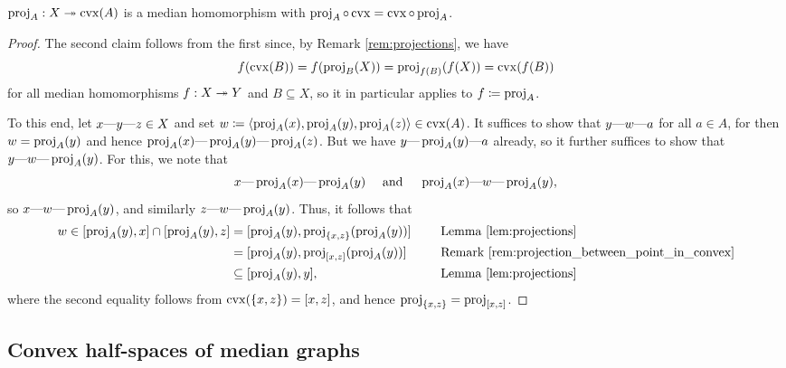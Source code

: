 \documentclass[reqno]{amsart}
\begin{document}
    \begin{lemma}\label{lem:projection_homomorphism}
        $\proj_A:X\onto\cvx(A)$ is a median homomorphism with $\proj_A\circ\cvx=\cvx\circ\proj_A$.
    \end{lemma}
    \begin{proof}
        The second claim follows from the first since, by Remark \ref{rem:projections}, we have
        \begin{equation*}
            f(\cvx(B))=f(\proj_B(X))=\proj_{f(B)}(f(X))=\cvx(f(B))
        \end{equation*}
        for all median homomorphisms $f:X\onto Y$ and $B\subseteq X$, so it in particular applies to $f\coloneqq\proj_A$.

        To this end, let $x\-y\-z\in X$ and set $w\coloneqq\l\langle\proj_A(x),\proj_A(y),\proj_A(z)\r\rangle\in\cvx(A)$. It suffices to show that $y\-w\-a$ for all $a\in A$, for then $w=\proj_A(y)$ and hence $\proj_A(x)\-\proj_A(y)\-\proj_A(z)$. But we have $y\-\proj_A(y)\-a$ already, so it further suffices to show that $y\-w\-\proj_A(y)$. For this, we note that
        \begin{equation*}
            x\-\proj_A(x)\-\proj_A(y)\ \ \ \ \mathrm{and}\ \ \ \ \proj_A(x)\-w\-\proj_A(y),
        \end{equation*}
        so $x\-w\-\proj_A(y)$, and similarly $z\-w\-\proj_A(y)$. Thus, it follows that
        \begin{equation*}
            \begin{aligned}
                w\in[\proj_A(y),x]\cap[\proj_A(y),z]&=[\proj_A(y),\proj_{\l\{x,z\r\}}(\proj_A(y))]\ \ \ \ && \textrm{Lemma \ref{lem:projections}} \\
                                                    &=[\proj_A(y),\proj_{\l[x,z\r]}(\proj_A(y))]\ \ \ \ &&\textrm{Remark \ref{rem:projection_between_point_in_convex}} \\
                                                    &\subseteq[\proj_A(y),y],\ \ \ \ && \textrm{Lemma \ref{lem:projections}}
            \end{aligned}
        \end{equation*}
        where the second equality follows from $\cvx(\l\{x,z\r\})=[x,z]$, and hence $\proj_{\l\{x,z\r\}}=\proj_{\l[x,z\r]}$.
    \end{proof}

    \subsection{Convex half-spaces of median graphs}\label{sec:convex_half-spaces_of_median_graphs}
\end{document}
